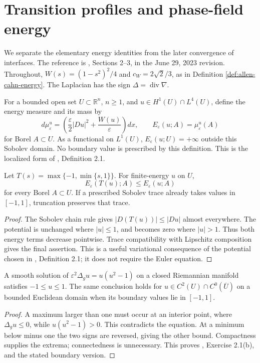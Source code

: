 \chapter{Transition profiles and phase-field energy}\label{sec:phase-energy}
We separate the elementary energy identities from the later convergence of interfaces. The reference is \cite{ChAC}, Sections 2--3, in the June 29, 2023 revision. Throughout, $W(s)=(1-s^2)^2/4$ and $c_W=2\sqrt2/3$, as in Definition \ref{def:allen-cahn-energy}. The Laplacian has the sign $\Delta=\operatorname{div}\nabla$.

\begin{definition}\label{def:phase-local-energy}
For a bounded open set $U\subset\mathbb R^n$, $n\geq1$, and $u\in H^1(U)\cap L^4(U)$, define the energy measure and its mass by
\[
 d\mu_\varepsilon^u=\left(\frac\varepsilon2|Du|^2+\frac{W(u)}\varepsilon\right)dx,
 \qquad E_\varepsilon(u;A)=\mu_\varepsilon^u(A)
\]
for Borel $A\subset U$. As a functional on $L^1(U)$, $E_\varepsilon(u;U)=+\infty$ outside this Sobolev domain. No boundary value is prescribed by this definition. This is the localized form of \cite{ChAC}, Definition 2.1.
\end{definition}

\begin{proposition}\label{prop:phase-truncation}
Let $T(s)=\max\{-1,\min\{s,1\}\}$. For finite-energy $u$ on $U$,
\[
 E_\varepsilon(T(u);A)\leq E_\varepsilon(u;A)
\]
for every Borel $A\subset U$. If a prescribed Sobolev trace already takes values in $[-1,1]$, truncation preserves that trace.
\end{proposition}
\begin{proof}
The Sobolev chain rule gives $|D(T(u))|\leq|Du|$ almost everywhere. The potential is unchanged where $|u|\leq1$, and becomes zero where $|u|>1$. Thus both energy terms decrease pointwise. Trace compatibility with Lipschitz composition gives the final assertion. This is a useful variational consequence of the potential chosen in \cite{ChAC}, Definition 2.1; it does not require the Euler equation.
\end{proof}

\begin{proposition}\label{prop:phase-maximum-bound}
A smooth solution of $\varepsilon^2\Delta_g u=u(u^2-1)$ on a closed Riemannian manifold satisfies $-1\leq u\leq1$. The same conclusion holds for $u\in C^2(U)\cap C^0(\overline U)$ on a bounded Euclidean domain when its boundary values lie in $[-1,1]$.
\end{proposition}
\begin{proof}
A maximum larger than one must occur at an interior point, where $\Delta_g u\leq0$, while $u(u^2-1)>0$. This contradicts the equation. At a minimum below minus one the two signs are reversed, giving the other bound. Compactness supplies the extrema; connectedness is unnecessary. This proves \cite{ChAC}, Exercise 2.1(b), and the stated boundary version.
\end{proof}

